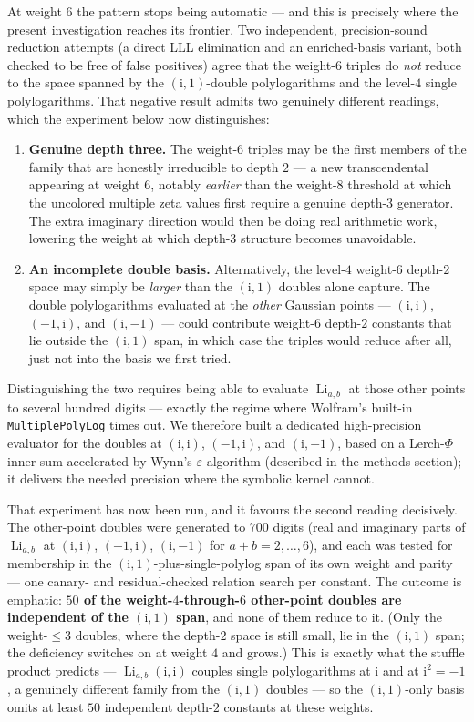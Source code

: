 \documentclass[11pt]{article}
\DeclareMathOperator{\Li}{Li}
\newcommand{\iu}{\mathrm{i}}
\theoremstyle{plain}
\theoremstyle{remark}
\begin{document}
At weight $6$ the pattern stops being automatic --- and this is precisely where the present investigation reaches its frontier. Two independent, precision-sound reduction attempts (a direct LLL elimination and an enriched-basis variant, both checked to be free of false positives) agree that the weight-$6$ triples do \emph{not} reduce to the space spanned by the $(\iu,1)$-double polylogarithms and the level-$4$ single polylogarithms. That negative result admits two genuinely different readings, which the experiment below now distinguishes:
\begin{enumerate}
  \item \textbf{Genuine depth three.} The weight-$6$ triples may be the first members of the family that are honestly irreducible to depth $2$ --- a new transcendental appearing at weight $6$, notably \emph{earlier} than the weight-$8$ threshold at which the uncolored multiple zeta values first require a genuine depth-$3$ generator. The extra imaginary direction would then be doing real arithmetic work, lowering the weight at which depth-$3$ structure becomes unavoidable.
  \item \textbf{An incomplete double basis.} Alternatively, the level-$4$ weight-$6$ depth-$2$ space may simply be \emph{larger} than the $(\iu,1)$ doubles alone capture. The double polylogarithms evaluated at the \emph{other} Gaussian points --- $(\iu,\iu)$, $(-1,\iu)$, and $(\iu,-1)$ --- could contribute weight-$6$ depth-$2$ constants that lie outside the $(\iu,1)$ span, in which case the triples would reduce after all, just not into the basis we first tried.
\end{enumerate}
Distinguishing the two requires being able to evaluate $\Li_{a,b}$ at those other points to several hundred digits --- exactly the regime where Wolfram's built-in \texttt{MultiplePolyLog} times out. We therefore built a dedicated high-precision evaluator for the doubles at $(\iu,\iu)$, $(-1,\iu)$, and $(\iu,-1)$, based on a Lerch-$\Phi$ inner sum accelerated by Wynn's $\varepsilon$-algorithm (described in the methods section); it delivers the needed precision where the symbolic kernel cannot.

That experiment has now been run, and it favours the second reading decisively. The other-point doubles were generated to $700$ digits (real and imaginary parts of $\Li_{a,b}$ at $(\iu,\iu)$, $(-1,\iu)$, $(\iu,-1)$ for $a+b=2,\dots,6$), and each was tested for membership in the $(\iu,1)$-plus-single-polylog span of its own weight and parity --- one canary- and residual-checked relation search per constant. The outcome is emphatic: \textbf{$50$ of the weight-$4$-through-$6$ other-point doubles are independent of the $(\iu,1)$ span}, and none of them reduce to it. (Only the weight-$\le 3$ doubles, where the depth-$2$ space is still small, lie in the $(\iu,1)$ span; the deficiency switches on at weight $4$ and grows.) This is exactly what the stuffle product predicts --- $\Li_{a,b}(\iu,\iu)$ couples single polylogarithms at $\iu$ and at $\iu^{2}=-1$, a genuinely different family from the $(\iu,1)$ doubles --- so the $(\iu,1)$-only basis omits at least $50$ independent depth-$2$ constants at these weights.
\end{document}
